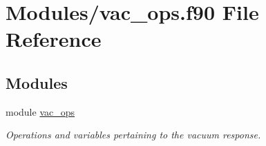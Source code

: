 \hypertarget{vac__ops_8f90}{}\section{Modules/vac\+\_\+ops.f90 File Reference}
\label{vac__ops_8f90}
\subsection*{Modules}
\begin{DoxyCompactItemize}
\item 
module \hyperlink{namespacevac__ops}{vac\+\_\+ops}
\begin{DoxyCompactList}\small\item\em Operations and variables pertaining to the vacuum response. \end{DoxyCompactList}\end{DoxyCompactItemize}
